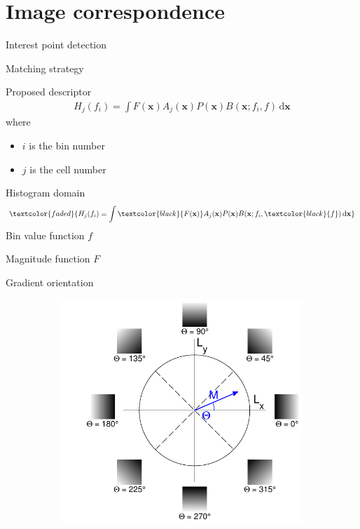 \documentclass[14pt,t]{beamer}
\def\x{\mathbf{x}}
\begin{document}
\section{Image correspondence}
%
\begin{frame}{Interest point detection}
\end{frame}
%
\begin{frame}{Matching strategy}
\end{frame}
%
\begin{frame}{Proposed descriptor}
\begin{align*}
H_j(f_i) = \int F(\x) A_j (\x) P (\x) B(\x; f_i,f) \,\text{d} \x
\end{align*}
where
\begin{itemize}
\item[] $i$ is the bin number
\item[] $j$ is the cell number
\end{itemize}
\end{frame}
%
\begin{frame}{Histogram domain}
\begin{align*}
\textcolor{faded}{H_j(f_i) = \int \textcolor{black}{F(\x)} A_j (\x) P (\x) B(\x; f_i,\textcolor{black}{f}) \,\text{d} \x}
\end{align*}
Bin value function $f$

Magnitude function $F$
\end{frame}
%
\begin{frame}{Gradient orientation}
\begin{figure}
\centering
	\begin{subfigure}[t]{0.75\textwidth}
		\includegraphics[width=\textwidth]{../report/img/gradientOrientationTheory.pdf}
	\end{subfigure}
\end{figure}
\end{frame}
\end{document}
